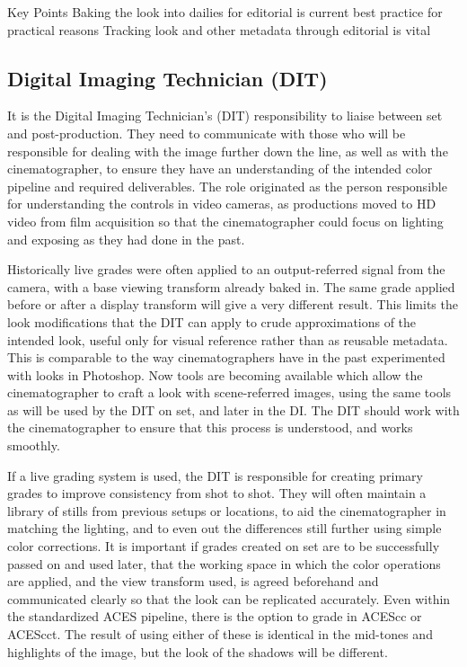 Key Points
Baking the look into dailies for editorial is current best practice for practical reasons
Tracking look and other metadata through editorial is vital

\subsection{Digital Imaging Technician (DIT)}

It is the Digital Imaging Technician’s (DIT) responsibility to liaise between set and post-production. They need to communicate with those who will be responsible for dealing with the image further down the line, as well as with the cinematographer, to ensure they have an understanding of the intended color pipeline and required deliverables. The role originated as the person responsible for understanding the controls in video cameras, as productions moved to HD video from film acquisition so that the cinematographer could focus on lighting and exposing as they had done in the past.

Historically live grades were often applied to an output-referred signal from the camera, with a base viewing transform already baked in. The same grade applied before or after a display transform will give a very different result. This limits the look modifications that the DIT can apply to crude approximations of the intended look, useful only for visual reference rather than as reusable metadata. This is comparable to the way cinematographers have in the past experimented with looks in Photoshop. Now tools are becoming available which allow the cinematographer to craft a look with scene-referred images, using the same tools as will be used by the DIT on set, and later in the DI. The DIT should work with the cinematographer to ensure that this process is understood, and works smoothly.

If a live grading system is used, the DIT is responsible for creating primary grades to improve consistency from shot to shot. They will often maintain a library of stills from previous setups or locations, to aid the cinematographer in matching the lighting, and to even out the differences still further using simple color corrections. It is important if grades created on set are to be successfully passed on and used later, that the working space in which the color operations are applied, and the view transform used, is agreed beforehand and communicated clearly so that the look can be replicated accurately. Even within the standardized ACES pipeline, there is the option to grade in ACEScc or ACEScct. The result of using either of these is identical in the mid-tones and highlights of the image, but the look of the shadows will be different.

